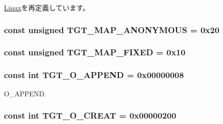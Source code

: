 \hyperlink{classLinux_a1def346ff527c8efccfd52463f3b5dc1}{Linux}を再定義しています。\hypertarget{classSparcLinux_a0bbc267200567dd98250b99b6085a499}{
\subsubsection[{TGT\_\-MAP\_\-ANONYMOUS}]{\setlength{\rightskip}{0pt plus 5cm}const unsigned {\bf TGT\_\-MAP\_\-ANONYMOUS} = 0x20}}
\label{classSparcLinux_a0bbc267200567dd98250b99b6085a499}
\hypertarget{classSparcLinux_a0124e421d7846143bca15728b7a53e14}{
\subsubsection[{TGT\_\-MAP\_\-FIXED}]{\setlength{\rightskip}{0pt plus 5cm}const unsigned {\bf TGT\_\-MAP\_\-FIXED} = 0x10}}
\label{classSparcLinux_a0124e421d7846143bca15728b7a53e14}
\hypertarget{classSparcLinux_af11adc5404ea3780a5ce2829cc3710b7}{
\subsubsection[{TGT\_\-O\_\-APPEND}]{\setlength{\rightskip}{0pt plus 5cm}const int {\bf TGT\_\-O\_\-APPEND} = 0x00000008}}
\label{classSparcLinux_af11adc5404ea3780a5ce2829cc3710b7}


O\_\-APPEND. \hypertarget{classSparcLinux_aec02e04ca367e6c3f4b46e4edc12efac}{
\subsubsection[{TGT\_\-O\_\-CREAT}]{\setlength{\rightskip}{0pt plus 5cm}const int {\bf TGT\_\-O\_\-CREAT} = 0x00000200}}
\label{classSparcLinux_aec02e04ca367e6c3f4b46e4edc12efac}



